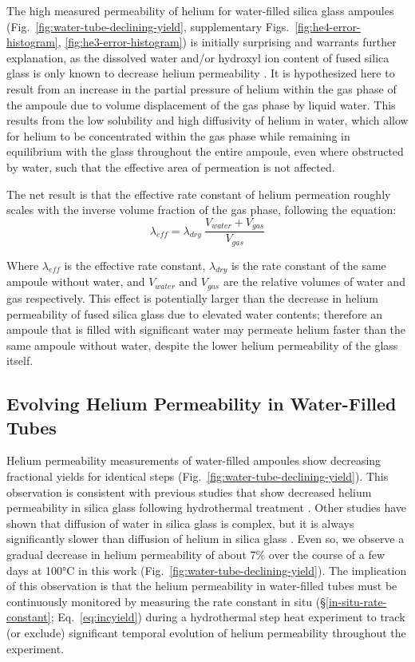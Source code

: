 The high measured permeability of helium for water-filled silica glass ampoules (Fig.~\ref{fig:water-tube-declining-yield}, supplementary Figs.~\ref{fig:he4-error-histogram}, \ref{fig:he3-error-histogram}) is initially surprising and warrants further explanation, as the dissolved water and/or hydroxyl ion content of fused silica glass is only known to decrease helium permeability \citep{tsuru2011,shelby1972,masaryk1968}. It is hypothesized here to result from an increase in the partial pressure of helium within the gas phase of the ampoule due to volume displacement of the gas phase by liquid water. This results from the low solubility \citep{sander2015} and high diffusivity \citep{verhallen1984} of helium in water, which allow for helium to be concentrated within the gas phase while remaining in equilibrium with the glass throughout the entire ampoule, even where obstructed by water, such that the effective area of permeation is not affected.

The net result is that the effective rate constant of helium permeation roughly scales with the inverse volume fraction of the gas phase, following the equation: \begin{equation}
\label{eq:keff}
\lambda_{eff} = \lambda_{dry}\ \frac{V_{water} + V_{gas}}{V_{gas}}
\end{equation}

Where \(\lambda_{eff}\) is the effective rate constant, \(\lambda_{dry}\) is the rate constant of the same ampoule without water, and \(V_{water}\) and \(V_{gas}\) are the relative volumes of water and gas respectively. This effect is potentially larger than the decrease in helium permeability of fused silica glass due to elevated water contents; therefore an ampoule that is filled with significant water may permeate helium faster than the same ampoule without water, despite the lower helium permeability of the glass itself.

\subsection{Evolving Helium Permeability in Water-Filled Tubes}\label{evolving-helium-permeability-in-water-filled-tubes}

Helium permeability measurements of water-filled ampoules show decreasing fractional yields for identical steps (Fig.~\ref{fig:water-tube-declining-yield}). This observation is consistent with previous studies that show decreased helium permeability in silica glass following hydrothermal treatment \citep{tsuru2011,masaryk1968}. Other studies have shown that diffusion of water in silica glass is complex, but it is always significantly slower than diffusion of helium in silica glass \citep{oehler2004,swets1961}. Even so, we observe a gradual decrease in helium permeability of about 7\% over the course of a few days at 100°C in this work (Fig.~\ref{fig:water-tube-declining-yield}). The implication of this observation is that the helium permeability in water-filled tubes must be continuously monitored by measuring the rate constant in situ (\S\ref{in-situ-rate-constant}; Eq.~\eqref{eq:incyield}) during a hydrothermal step heat experiment to track (or exclude) significant temporal evolution of helium permeability throughout the experiment.

